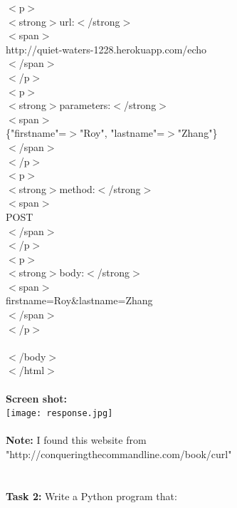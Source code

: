 \documentclass{article}
\begin{document}
			  $<$p$>$\\
			\indent\indent
			    $<$strong$>$url:$<$/strong$>$\\
			\indent\indent
			    $<$span$>$\\
			\indent\indent\indent
			      http://quiet-waters-1228.herokuapp.com/echo\\
			\indent\indent
			    $<$/span$>$\\
			\indent
			  $<$/p$>$\\
			\indent
			  $<$p$>$\\
			\indent\indent
			    $<$strong$>$parameters:$<$/strong$>$\\
			\indent\indent
			    $<$span$>$\\
			\indent\indent\indent
			      \{"firstname"=$>$"Roy", "lastname"=$>$"Zhang"\}\\
			\indent\indent
			    $<$/span$>$\\
			\indent
			  $<$/p$>$\\
			\indent
			  $<$p$>$\\
			\indent\indent
			    $<$strong$>$method:$<$/strong$>$\\
			\indent\indent
			    $<$span$>$\\
			\indent\indent\indent
			      POST\\
			\indent\indent
			    $<$/span$>$\\
			\indent
			  $<$/p$>$\\
			\indent
			  $<$p$>$\\
			\indent\indent
			    $<$strong$>$body:$<$/strong$>$\\
			\indent\indent
			    $<$span$>$\\
			\indent\indent\indent
			      firstname=Roy\&lastname=Zhang\\
			\indent\indent
			    $<$/span$>$\\
			\indent
			  $<$/p$>$\\\\
			$<$/body$>$\\
			$<$/html$>$\\\\
		\textbf{Screen shot:}\\
		\texttt{[image: response.jpg]}\\\\
		\textbf{Note:} I found this website from "http://conqueringthecommandline.com/book/curl"\\\\\\
		\textbf{Task 2:} Write a Python program that:\\
\end{document}
